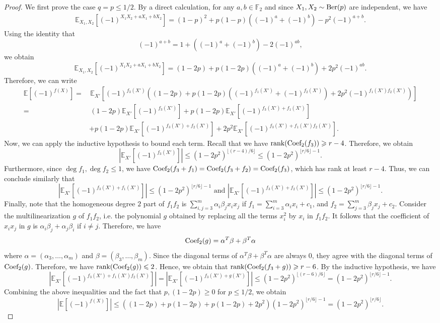 \documentclass[reqno]{amsart}
\theoremstyle{definition}
\numberwithin{theorem}{section}
\renewcommand{\leq}{\le}
\renewcommand{\geq}{\ge}
\newcommand{\FF}{\mathbb F}
\renewcommand{\le}{\leqslant}
\renewcommand{\ge}{\geqslant}
\newcommand{\EE}{\mathbb E}
\newcommand{\abs}[1]{\left|#1\right|}
\newcommand{\Ber}{\textup{Ber}}
\newcommand{\rank}{\textup{rank}}
\newcommand{\Coef}{\textup{Coef}}
\begin{document}
\begin{proof}
    We first prove the case $q=p\leq 1/2$.
    By a direct calculation, for any $a,b\in\FF_2$ and since $X_1,X_2\sim \Ber(p)$ are independent, we have
    \begin{align}\label{eq:Exp}
        \EE_{X_1,X_2}[(-1)^{X_1X_2+aX_1+bX_2}] = (1-p)^2 + p(1-p)((-1)^a+(-1)^b)-p^2(-1)^{a+b}.
    \end{align}
    Using the identity that 
    \[(-1)^{a+b}= 1+((-1)^a + (-1)^b)-2(-1)^{ab},\]
    we obtain
    \begin{equation}
        \EE_{X_1,X_2}[(-1)^{X_1X_2+aX_1+bX_2}] = (1-2p) + p(1-2p)((-1)^a+(-1)^b)+2p^2(-1)^{ab}.
    \end{equation}
    Therefore, we can write
    \begin{align*}
        \EE[(-1)^{f(X)}] =&\,\EE_{X'}\left[(-1)^{f_3(X')}\left((1-2p) + p(1-2p)((-1)^{f_1(X')}+(-1)^{f_2(X')})+2p^2(-1)^{f_1(X')f_2(X')}\right)\right]\\
        =&\,(1-2p)\EE_{X'}\left[(-1)^{f_3(X')}\right]+p(1-2p)\EE_{X'}\left[(-1)^{f_3(X')+f_1(X')}\right]\\
        &+p(1-2p)\EE_{X'}\left[(-1)^{f_3(X')+f_2(X')}\right]+2p^2\EE_{X'}\left[(-1)^{f_3(X')+f_1(X')f_2(X')}\right].
    \end{align*}
    Now, we can apply the inductive hypothesis to bound each term. Recall that we have $\rank(\Coef_2(f_3))\geq r-4$. Therefore, we obtain 
    \[\abs{\EE_{X'}\left[(-1)^{f_3(X')}\right]}\leq (1-2p^2)^{\lfloor(r-4)/6\rfloor}\leq (1-2p^2)^{\lfloor r/6\rfloor-1}.\]
    Furthermore, since $\deg f_1, \deg f_2\le 1$, we have $\Coef_2(f_3+f_1)=\Coef_2(f_3+f_2)=\Coef_2(f_3)$, which has rank at least $r-4$. Thus, we can conclude similarly that
    \[\abs{\EE_{X'}\left[(-1)^{f_3(X')+f_1(X')}\right]}\leq (1-2p^2)^{\lfloor r/6\rfloor-1}\text{ and }\abs{\EE_{X'}\left[(-1)^{f_3(X')+f_2(X')}\right]}\leq (1-2p^2)^{\lfloor r/6\rfloor-1}.\]
    Finally, note that the homogeneous degree $2$ part of $f_1f_2$ is $\sum_{i,j=3}^m\alpha_i\beta_jx_ix_j$ if $f_1=\sum_{i=3}^m\alpha_ix_i+c_1$, and $f_2=\sum_{j=3}^m\beta_jx_j+c_2$. Consider the multilinearization $g$ of $f_1f_2$, i.e. the polynomial $g$ obtained by replacing all the terms $x_i^2$ by $x_i$ in $f_1f_2$. It follows that the coefficient of $x_ix_j$ in $g$ is $\alpha_i\beta_j+\alpha_j\beta_i$ if $i\neq j$. Therefore, we have
    \[\Coef_2(g)=\alpha^T\beta+\beta^T\alpha\]
    where $\alpha=(\alpha_3,\dots,\alpha_m)$ and $\beta=(\beta_3,\dots,\beta_m)$. Since the diagonal terms of $\alpha^T\beta+\beta^T\alpha$ are always $0$, they agree with the diagonal terms of $\Coef_2(g)$.
    Therefore, we have $\rank(\Coef_2(g))\leq 2$. Hence, we obtain that $\rank(\Coef_2(f_3+g))\geq r-6$. By the inductive hypothesis, we have
    \[\abs{\EE_{X'}\left[(-1)^{f_3(X')+f_1(X')f_2(X')}\right]}=\abs{\EE_{X'}\left[(-1)^{f_3(X')+g(X')}\right]}\leq (1-2p^2)^{\lfloor(r-6)/6\rfloor} = (1-2p^2)^{\lfloor r/6\rfloor-1}.\]
    Combining the above inequalities and the fact that $p,(1-2p)\geq 0$ for $p\le 1/2$, we obtain
    \[\abs{\EE[(-1)^{f(X)}]}\leq \left((1-2p)+p(1-2p)+p(1-2p)+2p^2\right)(1-2p^2)^{\lfloor r/6\rfloor-1}=(1-2p^2)^{\lfloor r/6\rfloor}.\]


\end{proof}
\end{document}
